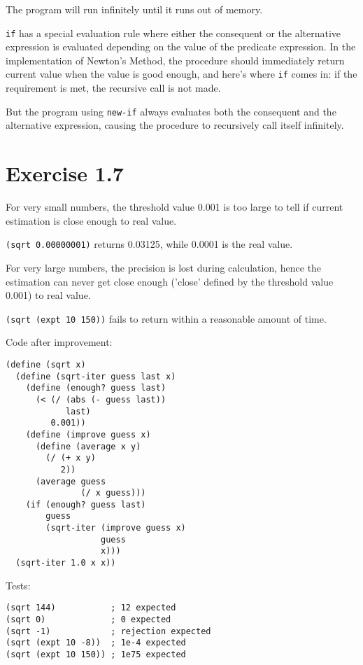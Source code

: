 \documentclass[../main.tex]{subfiles}
\begin{document}
The program will run infinitely until it runs out of memory.

\lstinline{if} has a special evaluation rule where either the consequent
 or the alternative expression is evaluated depending on the value of
 the predicate expression. In the implementation of Newton's Method,
 the procedure should immediately return current value when the value
 is good enough, and here's where \lstinline{if} comes in: if the
 requirement is met, the recursive call is not made.
 
But the program using \lstinline{new-if} always evaluates both the
 consequent and the alternative expression, causing the procedure to
 recursively call itself infinitely.

\section{Exercise 1.7}

For very small numbers, the threshold value 0.001 is too large to tell
 if current estimation is close enough to real value.

\lstinline{(sqrt 0.00000001)} returns 0.03125, while 0.0001 is the real value.

For very large numbers, the precision is lost during calculation, hence
 the estimation can never get close enough ('close' defined by the
 threshold value 0.001) to real value.

\lstinline{(sqrt (expt 10 150))} fails to return within a reasonable
 amount of time.

Code after improvement:

\begin{lstlisting}
(define (sqrt x)
  (define (sqrt-iter guess last x)
    (define (enough? guess last)
      (< (/ (abs (- guess last))
            last)
         0.001))
    (define (improve guess x)
      (define (average x y)
        (/ (+ x y)
           2))
      (average guess
               (/ x guess)))
    (if (enough? guess last)
        guess
        (sqrt-iter (improve guess x)
                   guess
                   x)))
  (sqrt-iter 1.0 x x))
\end{lstlisting}

Tests:

\begin{lstlisting}
(sqrt 144)           ; 12 expected
(sqrt 0)             ; 0 expected
(sqrt -1)            ; rejection expected
(sqrt (expt 10 -8))  ; 1e-4 expected
(sqrt (expt 10 150)) ; 1e75 expected
\end{lstlisting}
\end{document}
